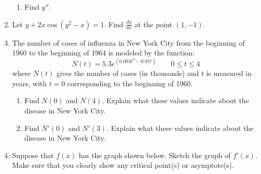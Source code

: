 \documentclass[letterpaper,12pt,fleqn]{article}
\begin{document}
\begin{enumerate}[left=0in]
\begin{enumerate}
  \item Find \(y''\).
  \end{enumerate}

  \newpage

\item Let \(y+2x\cos(y^2-x)=1\).  Find \(\frac{dy}{dx}\) at the point \((1,-1)\).

  \newpage

\item The number of cases of influenza in New York City from the beginning of 1960 to the beginning of 1964 is
  modeled by the function:
  \[N(t)=5.3e^{(0.093t^2-0.87t)}\qquad0\le t\le4\]
  where \(N(t)\) gives the number of cases (in thousands) and \(t\) is measured in years, with \(t=0\) corresponding
  to the beginning of 1960.

  \bigskip

  \begin{enumerate}
  \item Find \(N(0)\) and \(N(4)\).  Explain what these values indicate about the disease in New York City.

    \vspace{3in}

  \item Find \(N'(0)\) and \(N'(3)\).  Explain what these values indicate about the disease in New York City.
  \end{enumerate}

  \newpage

\item Suppose that \(f(x)\) has the graph shown below.  Sketch the graph of \(f'(x)\).  Make sure that you clearly
  show any critical point(s) or asymptote(s).

  \vspace{0.25in}

  \begin{center}
  \end{center}


\end{enumerate}
\end{document}

